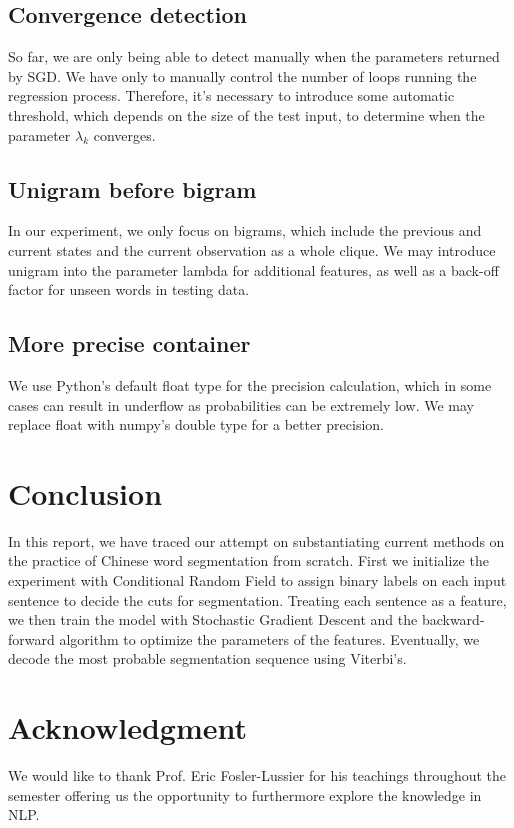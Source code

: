 \documentclass[UTF8,11pt]{article}
\begin{document}
\subsection{Convergence detection}
\noindent So far, we are only being able to detect manually when the parameters returned by SGD. We have only to manually control the number of loops running the regression process. Therefore, it's necessary to introduce some automatic threshold, which depends on the size of the test input, to determine when the parameter $\lambda_k$ converges.

\subsection{Unigram before bigram}
\noindent In our experiment, we only focus on bigrams, which include the previous and current states and the current observation as a whole clique. We may introduce unigram into the parameter lambda for additional features, as well as a back-off factor for unseen words in testing data.

\subsection{More precise container}
\noindent We use Python's default float type for the precision calculation, which in some cases can result in underflow as probabilities can be extremely low. We may replace float with numpy's double type for a better precision.

\section{Conclusion}
\noindent In this report, we have traced our attempt on substantiating current methods on the practice of Chinese word segmentation from scratch. First we initialize the experiment with Conditional Random Field to assign binary labels on each input sentence to decide the cuts for segmentation. Treating each sentence as a feature, we then train the model with Stochastic Gradient Descent and the backward-forward algorithm to optimize the parameters of the features. Eventually, we decode the most probable segmentation sequence using Viterbi's. 

\section{Acknowledgment}
\noindent We would like to thank Prof. Eric Fosler-Lussier for his teachings throughout the semester offering us the opportunity to furthermore explore the knowledge in NLP.
\end{document}
